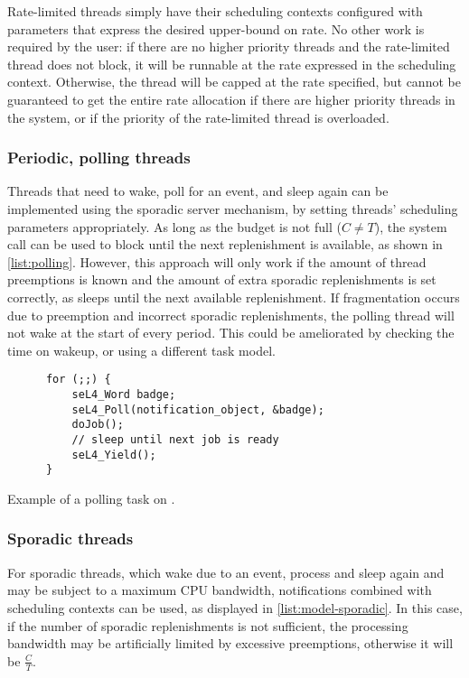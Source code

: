 Rate-limited threads simply have their scheduling contexts configured with
parameters that express the desired upper-bound on rate.  No other work is
required by the user: if there are no higher priority threads and the
rate-limited thread does not block, it will be runnable at the rate expressed
in the scheduling context.  Otherwise, the thread will be capped at the rate
specified, but cannot be guaranteed to get the entire rate allocation if there
are higher priority threads in the system, or if the priority of the
rate-limited thread is overloaded.

\subsubsection{Periodic, polling threads}

Threads that need to wake, poll for an event, and sleep again can be
implemented using the sporadic server mechanism, by  
setting threads' scheduling parameters appropriately. As long as the budget is
not full ($C\neq T$), the \yield system call can be used to block until the next replenishment
is available, as shown in \cref{list:polling}. However, this approach will only work if the amount of thread preemptions 
is known and the amount of extra sporadic replenishments is set correctly, as \yield sleeps until
the next available replenishment. If fragmentation occurs due to preemption and incorrect sporadic
replenishments, the polling thread will not wake at the start of every period. This could be
ameliorated by checking the time on wakeup, or using a different task model.  

\begin{listing}
  \begin{verbatim}
      for (;;) {
          seL4_Word badge;
          seL4_Poll(notification_object, &badge);
          doJob();
          // sleep until next job is ready
          seL4_Yield();
      }
  \end{verbatim}
  \caption{Example of a polling task on \selfour.}
  \label{list:polling}
\end{listing}

\subsubsection{Sporadic threads}

For sporadic threads, which wake due to an event, process and sleep again and may be subject to a
maximum CPU bandwidth, notifications combined
with scheduling contexts can be used, as displayed in \cref{list:model-sporadic}. In this case, if the
number of sporadic replenishments is not sufficient, the processing bandwidth may be artificially
limited by excessive preemptions, otherwise it will be $\frac{C}{T}$. 

